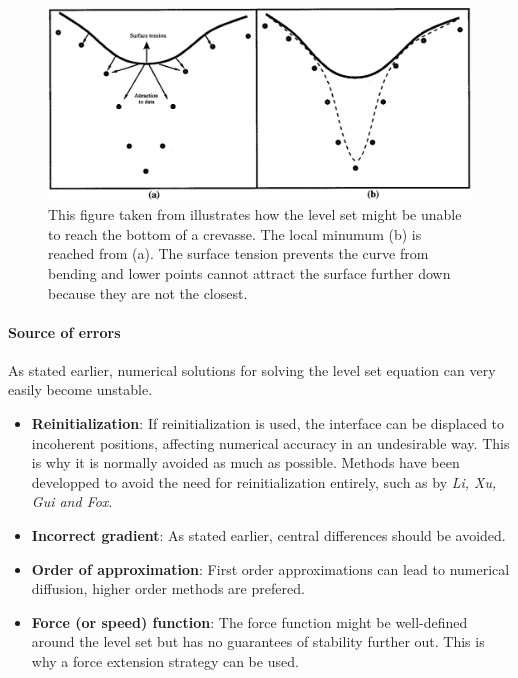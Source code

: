 \documentclass{article}
\begin{document}
\begin{figure}[H]
  \centering
  \includegraphics[width=1.0\textwidth]{img/savadjiev3_3.png}
  \caption{This figure taken from \cite{savadjiev2003surface} illustrates
  how the level set might be unable to reach the bottom of a crevasse. The local
  minumum (b) is reached from (a). The surface tension prevents the curve from
  bending and lower points cannot attract the surface further down because they
  are not the closest.}    
\end{figure}

\paragraph{Source of errors}
As stated earlier, numerical solutions for solving the level set equation can
very easily become unstable.
\begin{itemize}
    \item \textbf{Reinitialization}: If reinitialization is used, the interface
        can be displaced to incoherent positions, affecting numerical accuracy
        in an undesirable way. This is why it is normally avoided as much as
        possible. Methods have been developped to avoid the need for
        reinitialization entirely, such as \cite{li2010distance} by \emph{Li,
        Xu, Gui and Fox}.
    \item \textbf{Incorrect gradient}: As stated earlier, central differences
        should be avoided.
    \item \textbf{Order of approximation}: First order approximations can lead
        to numerical diffusion, higher order methods are prefered.
    \item \textbf{Force (or speed) function}: The force function might be
        well-defined around the level set but has no guarantees of stability
        further out. This is why a force extension strategy can be used. 
\end{itemize}



\end{document}
